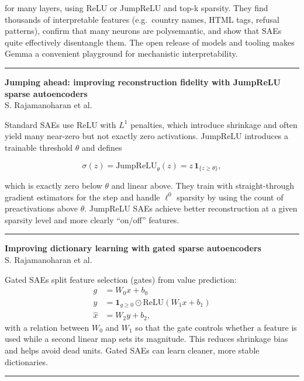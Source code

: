 \documentclass[a5paper]{article}
\let\ge\geqslant
\begin{document}
for many layers, using ReLU or JumpReLU and top-k sparsity. They find
thousands of interpretable features (e.g.~country names, HTML tags,
refusal patterns), confirm that many neurons are polysemantic, and show
that SAEs quite effectively disentangle them. The open release of models
and tooling makes Gemma a convenient playground for mechanistic
interpretability.

\begin{center}\rule{0.5\linewidth}{0.5pt}\end{center}

\textbf{Jumping ahead: improving reconstruction fidelity with JumpReLU
sparse autoencoders}\\
S. Rajamanoharan et al.

Standard SAEs use ReLU with $L^1$ penalties, which introduce shrinkage and
often yield many near-zero but not exactly zero activations. JumpReLU
introduces a trainable threshold $\theta$ and defines

\[ \sigma(z) = \mathrm{JumpReLU}_\theta(z) = z\,\mathbf{1}_{\{z\ge \theta\}}, \]

which is exactly zero below $\theta$ and linear above. They train with
straight-through gradient estimators for the step and handle $\ell^0$ sparsity
by using the count of preactivations above $\theta$. JumpReLU SAEs achieve
better reconstruction at a given sparsity level and more clearly
``on/off'' features.

\begin{center}\rule{0.5\linewidth}{0.5pt}\end{center}

\textbf{Improving dictionary learning with gated sparse autoencoders}\\
S. Rajamanoharan et al.

Gated SAEs split feature selection (gates) from value prediction:
\begin{align*}
  g &= W_0 x + b_0 \\
   y &=
  \mathbf{1}_{g\ge 0}\odot \mathrm{ReLU}(W_1 x + b_1)
  \\
   \hat x &=
W_2 y + b_2,
\end{align*}
with a relation between $W_0$ and $W_1$ so that the gate controls whether a
feature is used while a second linear map sets its magnitude. This
reduces shrinkage bias and helps avoid dead units. Gated SAEs can learn
cleaner, more stable dictionaries.

\begin{center}\rule{0.5\linewidth}{0.5pt}\end{center}
\end{document}
